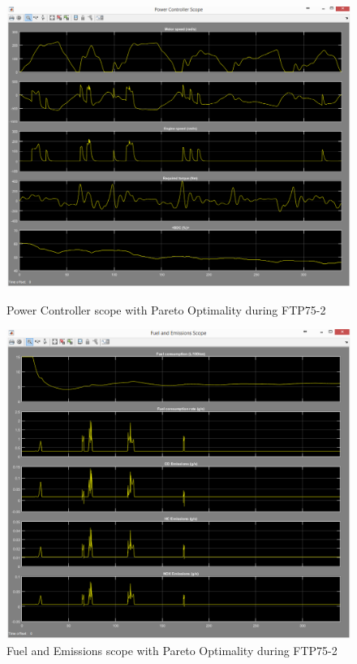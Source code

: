 \begin{figure}[hp]
\centering
\includegraphics[scale=0.4]{figures/Pareto/FTP75-2/powerController03Juli}
\caption{Power Controller scope with Pareto Optimality during FTP75-2}
\label{fig:pcpo2}
\includegraphics[scale=0.43]{figures/Pareto/FTP75-2/fuelEmissions03Juli}
\caption{Fuel and Emissions scope with Pareto Optimality during FTP75-2}
\label{fig:fepo2}
\end{figure}


